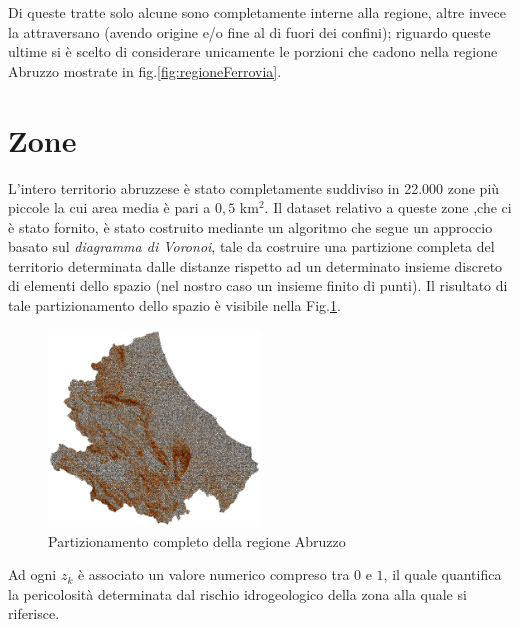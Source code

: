 Di queste tratte solo alcune sono completamente interne alla regione, altre invece la attraversano (avendo origine e/o fine al di fuori dei confini); riguardo queste ultime si è scelto di considerare unicamente le porzioni che cadono nella regione Abruzzo mostrate in fig.\ref{fig:regioneFerrovia}.
\newpage

\section{Zone}
\label{zone}
L'intero territorio abruzzese è stato completamente suddiviso in 22.000 zone più piccole la cui area media è pari a $0,5$ km$^2$. Il dataset relativo a queste zone ,che ci è stato fornito, è stato costruito mediante un algoritmo che segue un approccio basato sul \textit{diagramma di Voronoi}, tale da costruire una partizione completa del territorio determinata dalle distanze rispetto ad un determinato insieme discreto di elementi dello spazio (nel nostro caso un insieme finito di punti). Il risultato di tale partizionamento dello spazio è visibile nella Fig.\ref{fig:dataset}.
\begin{figure}[h]
	\centering
	\includegraphics[width=0.5\textwidth]{img/dataset}
	\caption{Partizionamento completo della regione Abruzzo}
    \label{fig:dataset}
\end{figure}

Ad ogni $z_k$ è associato un valore numerico compreso tra $0$ e $1$, il quale quantifica la pericolosità determinata dal rischio idrogeologico della zona alla quale si riferisce.


